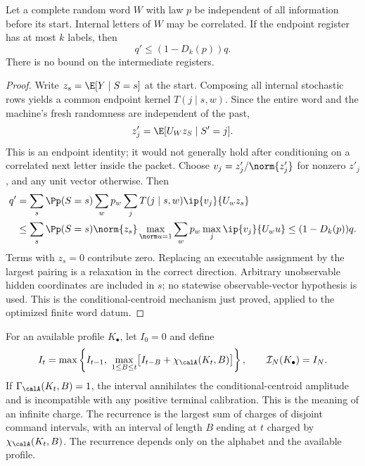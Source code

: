 \begin{lemma}\label{lem:packet}
Let a complete random word $W$ with law $p$ be independent of all information before its start. Internal letters of $W$ may be correlated. If the endpoint register has at most $k$ labels, then
\begin{equation}\label{eq:packet-contraction}
                       q'\le(1-D_k(p))q.
\end{equation}
There is no bound on the intermediate registers.
\end{lemma}
\begin{proof}
Write $z_s=\E[Y\mid S=s]$ at the start. Composing all internal stochastic rows yields a common endpoint kernel $T(j\mid s,w)$. Since the entire word and the machine's fresh randomness are independent of the past,
\[
 z'_j=\E[U_Wz_S\mid S'=j].
\]
This is an endpoint identity; it would not generally hold after conditioning on a correlated next letter inside the packet. Choose $v_j=z'_j/\norm{z'_j}$ for nonzero $z'_j$, and any unit vector otherwise. Then
\begin{align*}
 q'&=\sum_s\Pp(S=s)\sum_w p_w\sum_jT(j\mid s,w)\ip{v_j}{U_wz_s}\\
 &\le\sum_s\Pp(S=s)\norm{z_s}
       \max_{\norm u=1}\sum_w p_w\max_j\ip{v_j}{U_wu}
 \le(1-D_k(p))q.
\end{align*}
Terms with $z_s=0$ contribute zero. Replacing an executable assignment by the largest pairing is a relaxation in the correct direction. Arbitrary unobservable hidden coordinates are included in $s$; no statewise observable-vector hypothesis is used. This is the conditional-centroid mechanism just proved, applied to the optimized finite word datum.
\end{proof}

For an available profile $K_\bullet$, let $I_0=0$ and define
\begin{equation}\label{eq:interval-recursion}
 I_t=\max\left\{I_{t-1},\ 
        \max_{1\le B\le t}\bigl[I_{t-B}+\chi_{\calA}(K_t,B)\bigr]\right\},
 \qquad \mathcal I_N(K_\bullet)=I_N.
\end{equation}
If $\Gamma_{\calA}(K_t,B)=1$, the interval annihilates the conditional-centroid amplitude and is incompatible with any positive terminal calibration. This is the meaning of an infinite charge. The recurrence is the largest sum of charges of disjoint command intervals, with an interval of length $B$ ending at $t$ charged by $\chi_{\calA}(K_t,B)$. The recurrence depends only on the alphabet and the available profile.

